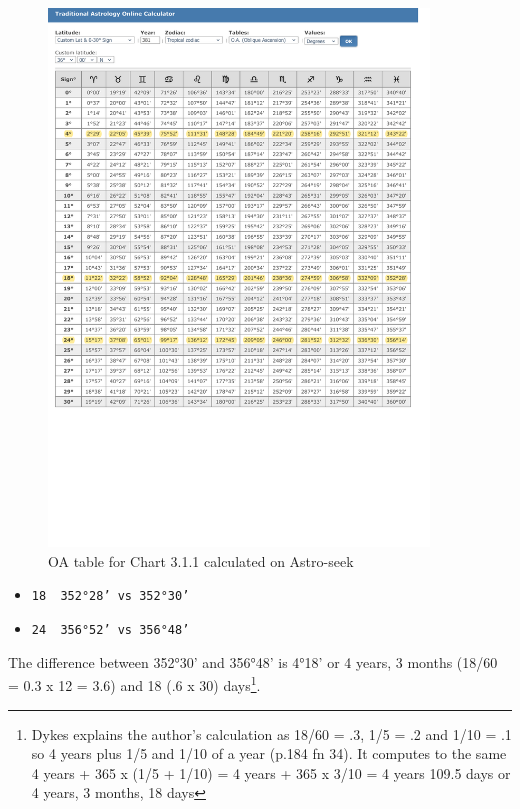 \begin{figure}[H]
\centering
\includegraphics[width=0.9\textwidth]
	{diagrams/3.1.1-OA-Table }
\vspace{-8em}
\caption{OA table for Chart 3.1.1 calculated on Astro-seek}
\end{figure}

\begin{itemize}[topsep=0em,itemsep=0em]
\item[] \texttt{18\Pisces\,        352°28'    vs       352°30'}
\item[] \texttt{24\Pisces\,        356°52'    vs       356°48'}
\end{itemize}

The difference between 352°30' and 356°48' is 4°18' or 4 years, 3 months (18/60 = 0.3 x 12 = 3.6) and 18 (.6 x 30) days\footnote{Dykes explains the author's calculation as 18/60 = .3, 1/5 = .2 and 1/10 = .1 so 4 years plus 1/5 and 1/10 of a year (p.184 fn 34). It computes to the same 4 years + 365 x (1/5 + 1/10) = 4 years + 365 x 3/10 = 4 years 109.5 days or 4 years, 3 months, 18 days}.

